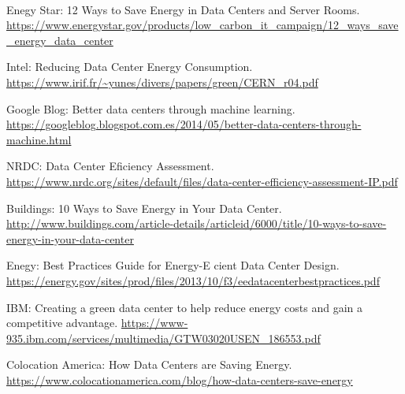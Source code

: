 \documentclass[10pt]{article}
\begin{document}
  	\paragraph{}
	\clearpage
  \begin{thebibliography}{9}

		Enegy Star: 12 Ways to Save Energy in Data Centers and Server Rooms. \newline \url{https://www.energystar.gov/products/low_carbon_it_campaign/12_ways_save_energy_data_center}

    Intel: Reducing Data Center Energy Consumption. \newline
 		\url{https://www.irif.fr/~yunes/divers/papers/green/CERN_r04.pdf}

    Google Blog: Better data centers through machine learning. \newline
		\url{https://googleblog.blogspot.com.es/2014/05/better-data-centers-through-machine.html}

    NRDC: Data Center Eficiency Assessment. \newline
 		\url{https://www.nrdc.org/sites/default/files/data-center-efficiency-assessment-IP.pdf}

    Buildings: 10 Ways to Save Energy in Your Data Center. \newline \url{http://www.buildings.com/article-details/articleid/6000/title/10-ways-to-save-energy-in-your-data-center}

		Enegy: Best Practices Guide for Energy-E cient Data Center Design. \newline
		\url{https://energy.gov/sites/prod/files/2013/10/f3/eedatacenterbestpractices.pdf}

		IBM: Creating a green data center to help reduce energy costs and gain a competitive advantage. \newline
		\url{https://www-935.ibm.com/services/multimedia/GTW03020USEN_186553.pdf}

		Colocation America: How Data Centers are Saving Energy. \newline
		\url{https://www.colocationamerica.com/blog/how-data-centers-save-energy}


\end{thebibliography}
\end{document}
